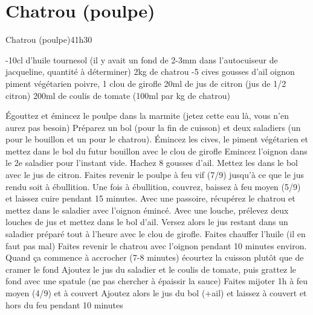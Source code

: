 {\section{Chatrou (poulpe)}
\begin{recette}{Chatrou (poulpe)}{4}{1h30}{}
\begin{ingredients}
-10cl d'huile tournesol (il y avait un fond de 2-3mm dans l'autocuiseur de jacqueline, quantité à déterminer)
\ingredient 2kg de chatrou
-5 cives
 gousses d'ail
 oignon
 piment végétarien
\ingredient poivre, 1 clou de girofle
\ingredient 20ml de jus de citron (jus de 1/2 citron)
\ingredient 200ml de coulis de tomate (100ml par kg de chatrou)
\end{ingredients}

\begin{preparation}
\etape Égouttez et émincez le poulpe dans la marmite (jetez cette eau là, vous n'en aurez pas besoin)
\etape Préparez un bol (pour la fin de cuisson) et deux saladiers (un pour le bouillon et un pour le chatrou). 
\etape Émincez les cives, le piment végétarien et mettez dans le bol du futur bouillon avec le clou de girofle
\etape Emincez l'oignon dans le 2e saladier pour l'instant vide.
\etape Hachez 8 gousses d'ail. Mettez les dans le bol avec le jus de citron. 
\etape Faites revenir le poulpe à feu vif (7/9) jusqu'à ce que le jus rendu soit à ébullition.
\etape Une fois à ébullition, couvrez, baissez à feu moyen (5/9) et laissez cuire pendant 15 minutes. 
\etape Avec une passoire, récupérez le chatrou et mettez dans le saladier avec l'oignon émincé. Avec une louche, prélevez deux louches de jus et mettez dans le bol d'ail. Versez alors le jus restant dans un saladier préparé tout à l'heure avec le clou de girofle.
\etape Faites chauffer l'huile (il en faut pas mal)
\etape Faites revenir le chatrou avec l'oignon pendant 10 minutes environ. Quand ça commence à accrocher (7-8 minutes) écourtez la cuisson plutôt que de cramer le fond
\etape Ajoutez le jus du saladier et le coulis de tomate, puis grattez le fond avec une spatule (ne pas chercher à épaissir la sauce)
\etape Faites mijoter 1h à feu moyen (4/9) et à couvert
\etape Ajoutez alors le jus du bol (+ail) et laissez à couvert et hors du feu pendant 10 minutes
\end{preparation}
\end{recette}


}
